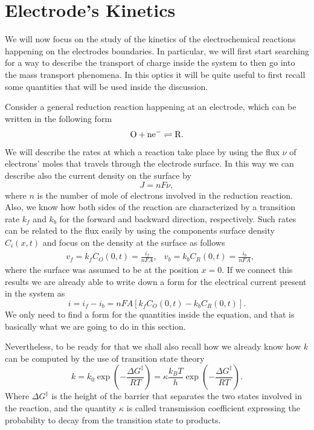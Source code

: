 \section{Electrode’s Kinetics}

We will now focus on the study of the kinetics of the electrochemical reactions happening on the electrodes boundaries. In particular, we will first start searching for a way to describe the transport of charge inside the system to then go into the mass transport phenomena. In this optics it will be quite useful to first recall some quantities that will be used inside the discussion.

Consider a general reduction reaction happening at an electrode, which can be written in the following form
\begin{equation}
    \ce{O + ne^-} \rightleftharpoons  \ce{R}.
\end{equation}
We will describe the rates at which a reaction take place by using the flux $\nu$ of electrons' moles that travels through the electrode surface. In this way we can describe also the current density on the surface by 
\begin{equation}
    J = nF\nu,
\end{equation}
where $n$ is the number of mole of electrons involved in the reduction reaction. Also, we know how both sides of the reaction are characterized by a transition rate $k_f$ and $k_b$ for the forward and backward direction, respectively. Such rates can be related to the flux easily by using the components surface density $C_i(x,t)$ and focus on the density at the surface as follows
\begin{align}
    &v_f = k_f C_O(0,t) = \frac{i_f}{nFA}, &v_b = k_b C_R(0,t) = \frac{i_b}{nFA},
\end{align}
where the surface was assumed to be at the position $x = 0$. If we connect this results we are already able to write down a form for the electrical current present in the system as
\begin{equation}
    \label{eq:TotalCurrentInterface}
    i = i_f - i_b = nFA[k_fC_O(0,t) - k_bC_R(0,t)].
\end{equation}
We only need to find a form for the quantities inside the equation, and that is basically what we are going to do in this section. 

Nevertheless, to be ready for that we shall also recall how we already know how $k$ can be computed by the use of transition state theory
\begin{equation}
    \label{eq:transitionRate}
    k = k_0\exp\left( -\frac{\Delta G^\ddagger}{RT} \right) = \kappa\frac{k_BT}{h}\exp\left( -\frac{\Delta G^\ddagger}{RT} \right).
\end{equation}
Where $\Delta G^\ddagger$ is the height of the barrier that separates the two states involved in the reaction, and the quantity $\kappa$ is called transmission coefficient expressing the probability to decay from the transition state to products.

